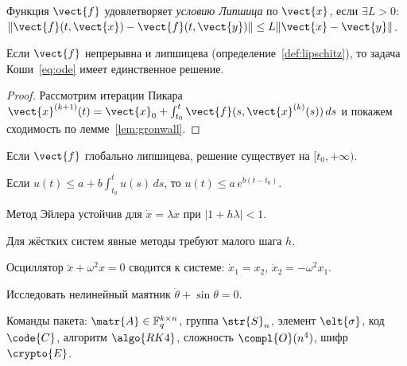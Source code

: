 \documentclass[font=modern]{cmcmsuthesis-cw}
\begin{document}
\begin{definition}\label{def:lipschitz}
Функция $\vect{f}$ удовлетворяет \emph{условию Липшица} по $\vect{x}$,
если $\exists L>0$: $\|\vect{f}(t,\vect{x})-\vect{f}(t,\vect{y})\|
\leq L\|\vect{x}-\vect{y}\|$.
\end{definition}

\begin{theorem}\label{thm:picard}
Если $\vect{f}$ непрерывна и липшицева
(определение~\ref{def:lipschitz}), то задача
Коши~\eqref{eq:ode} имеет единственное решение.
\end{theorem}

\begin{proof}
Рассмотрим итерации Пикара
$\vect{x}^{(k+1)}(t) = \vect{x}_0 +
\int_{t_0}^{t}\vect{f}(s,\vect{x}^{(k)}(s))\,ds$
и покажем сходимость по лемме~\ref{lem:gronwall}.
\end{proof}

\begin{corollary}\label{cor:global}
Если $\vect{f}$ глобально липшицева, решение существует
на $[t_0,+\infty)$.
\end{corollary}

\begin{lemma}\label{lem:gronwall}
Если $u(t) \leq a + b\int_{t_0}^t u(s)\,ds$,
то $u(t) \leq a\,e^{b(t-t_0)}$.
\end{lemma}

\begin{proposition}\label{prop:euler-stable}
Метод Эйлера устойчив для $\dot{x}=\lambda x$
при $|1+h\lambda|<1$.
\end{proposition}

\begin{remark}\label{rem:stiff}
Для жёстких систем явные методы требуют малого шага $h$.
\end{remark}

\begin{example}\label{ex:harmonic}
Осциллятор $\ddot{x}+\omega^2 x=0$ сводится к системе:
$\dot{x}_1=x_2$, $\dot{x}_2=-\omega^2 x_1$.
\end{example}

\begin{problem}\label{prob:pendulum}
Исследовать нелинейный маятник $\ddot{\theta}+\sin\theta=0$.
\end{problem}

Команды пакета: $\matr{A}\in\mathbb{F}^{k\times n}_q$,
группа $\str{S}_n$, элемент $\elt{\sigma}$, код $\code{C}$,
алгоритм $\algo{RK4}$, сложность $\compl{O}(n^4)$,
шифр $\crypto{E}$.
\end{document}
